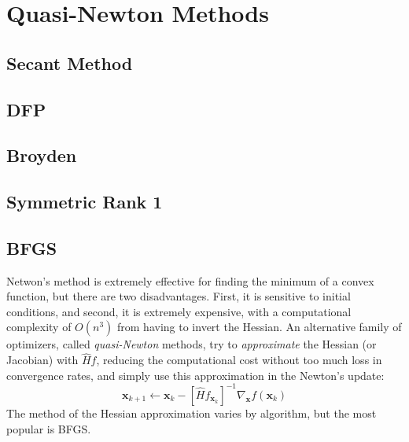 \section{Quasi-Newton Methods}

\subsection{Secant Method}

\subsection{DFP}

\subsection{Broyden}

\subsection{Symmetric Rank 1}

\subsection{BFGS}

  Netwon's method is extremely effective for finding the minimum of a convex function, but there are two disadvantages. First, it is sensitive to initial conditions, and second, it is extremely expensive, with a computational complexity of $O(n^3)$ from having to invert the Hessian. An alternative family of optimizers, called \textit{quasi-Newton} methods, try to \textit{approximate} the Hessian (or Jacobian) with $\hat{H} f$, reducing the computational cost without too much loss in convergence rates, and simply use this approximation in the Newton's update: 
  \[\mathbf{x}_{k+1} \gets \mathbf{x}_k - [\hat{H} f_{\mathbf{x}_k}]^{-1} \nabla_\mathbf{x} f (\mathbf{x}_k)\]
  The method of the Hessian approximation varies by algorithm, but the most popular is BFGS. 


